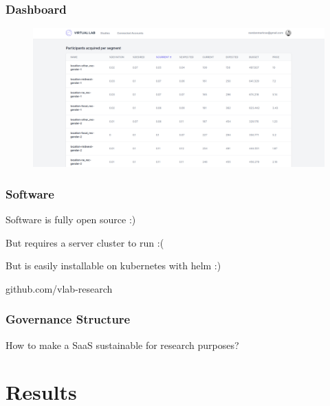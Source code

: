 \documentclass[aspectratio=169]{beamer}
\begin{document}
\begin{frame}
\frametitle{Dashboard}

\begin{figure}[H]
\includegraphics[width=\textwidth]{Figures/vlab-dash-2.png}
\end{figure}
\end{frame}

\begin{frame}
\frametitle{Software}

Software is fully open source :)

But requires a server cluster to run :(

But is easily installable on kubernetes with helm :)

github.com/vlab-research

\end{frame}

\begin{frame}
\frametitle{Governance Structure}

How to make a SaaS sustainable for research purposes?

\end{frame}

\section{Results}
\end{document}
